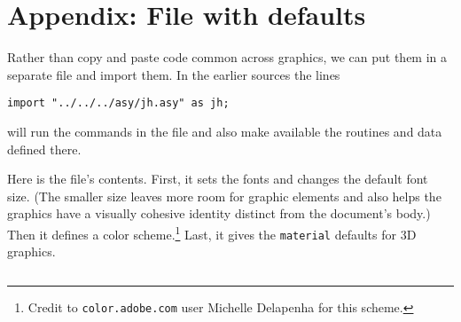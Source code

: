 \chapter*{Appendix: File with defaults}
Rather than copy and paste code common across graphics,
we can put them in a separate file and import them.
In the earlier \Asy{} sources the lines
\begin{verbatim}
import "../../../asy/jh.asy" as jh;  
\end{verbatim}
will run the commands in the file 
and also make available the routines and data defined there.

Here is the file's contents.
First, it sets the fonts
and changes the default font size.
(The smaller size leaves more room for graphic elements and
also helps the graphics have a visually cohesive identity distinct from 
the document's body.)
Then it defines a color scheme.\footnote{%
  Credit to \protect\texttt{color.adobe.com} user Michelle Delapenha for this scheme.}
Last, it gives the 
\texttt{material} defaults
for 3D graphics.
\begin{center}
  \inputminted{Asymptote}{../asy/jh.asy}
\end{center}
